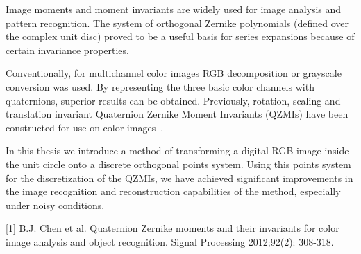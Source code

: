 Image moments and moment invariants are widely used for image analysis and pattern recognition. The system of orthogonal Zernike polynomials (defined over the complex unit disc) proved to be a useful basis for series expansions because of certain invariance properties.

Conventionally, for multichannel color images RGB decomposition or grayscale conversion was used. By representing the three basic color channels with quaternions, superior results can be obtained. Previously, rotation, scaling and translation invariant Quaternion Zernike Moment Invariants (QZMIs) have been constructed for use on color images~\cite{qzmi}.

In this thesis we introduce a method of transforming a digital RGB image inside the unit circle onto a discrete orthogonal points system. Using this points system for the discretization of the QZMIs, we have achieved significant improvements in the image recognition and reconstruction capabilities of the method, especially under noisy conditions.

[1] B.J. Chen et al. Quaternion Zernike moments and their invariants for color image analysis and object recognition. Signal Processing 2012;92(2): 308-318.
